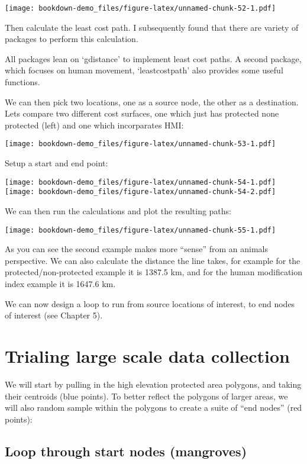 \documentclass[
]{book}
\begin{document}
\texttt{[image: bookdown-demo\_files/figure-latex/unnamed-chunk-52-1.pdf]}

Then calculate the least cost path. I subsequently found that there are variety of packages to perform this calculation.

All packages lean on `gdistance' to implement least cost paths. A second package, which focuses on human movement, `leastcostpath' also provides some useful functions.

We can then pick two locations, one as a source node, the other as a destination. Lets compare two different cost surfaces, one which just has protected none protected (left) and one which incorparates HMI:

\texttt{[image: bookdown-demo\_files/figure-latex/unnamed-chunk-53-1.pdf]}

Setup a start and end point:

\texttt{[image: bookdown-demo\_files/figure-latex/unnamed-chunk-54-1.pdf]} \texttt{[image: bookdown-demo\_files/figure-latex/unnamed-chunk-54-2.pdf]}

We can then run the calculations and plot the resulting paths:

\texttt{[image: bookdown-demo\_files/figure-latex/unnamed-chunk-55-1.pdf]}

As you can see the second example makes more ``sense'' from an animals perspective. We can also calculate the distance the line takes, for example for the protected/non-protected example it is 1387.5 km, and for the human modification index example it is 1647.6 km.

We can now design a loop to run from source locations of interest, to end nodes of interest (see Chapter 5).

\hypertarget{trialing-large-scale-data-collection}{%
\section{Trialing large scale data collection}\label{trialing-large-scale-data-collection}}

We will start by pulling in the high elevation protected area polygons, and taking their centroids (blue points). To better reflect the polygons of larger areas, we will also random sample within the polygons to create a suite of ``end nodes'' (red points):

\hypertarget{loop-through-start-nodes-mangroves}{%
\subsection{Loop through start nodes (mangroves)}\label{loop-through-start-nodes-mangroves}}
\end{document}
